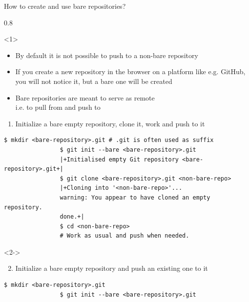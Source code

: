 \documentclass[usenames,svgnames,14pt]{beamer}
\begin{document}
\begin{frame}[fragile]{How to create and use bare repositories?}
    \setlength{\leftmarginii}{8mm}
    \begin{overlayarea}{\textwidth}{0.8\textheight}
        \begin{onlyenv}<1>
            \vspace{1mm}
            \begin{itemize}
                \item By default it is not possible to push to a non-bare repository
                \item If you create a new repository in the browser on a platform like e.g. GitHub, you will not notice it, but a bare one will be created
                \item \alert{Bare repositories are meant} to serve as remote\\ \then i.e. \alert{to pull from and push to}
            \end{itemize}
            \vspace{1mm}
            \begin{enumerate}
                \item Initialize a bare empty repository, clone it, work and push to it
            \end{enumerate}
            \begin{lstlisting}[style=MyBash]
                $ mkdir <bare-repository>.git # .git is often used as suffix
                $ git init --bare <bare-repository>.git
                |+Initialised empty Git repository <bare-repository>.git+|
                $ git clone <bare-repository>.git <non-bare-repo>
                |+Cloning into '<non-bare-repo>'...
                warning: You appear to have cloned an empty repository.
                done.+|
                $ cd <non-bare-repo>
                # Work as usual and push when needed.
            \end{lstlisting}
        \end{onlyenv}
        \begin{onlyenv}<2->
            \begin{enumerate}
                \setcounter{enumi}{1}
                \item Initialize a bare empty repository and push an existing one to it
            \end{enumerate}
            \begin{lstlisting}[style=MyBash]
                $ mkdir <bare-repository>.git
                $ git init --bare <bare-repository>.git

\end{lstlisting}
\end{onlyenv}
\end{overlayarea}
\end{frame}
\end{document}
